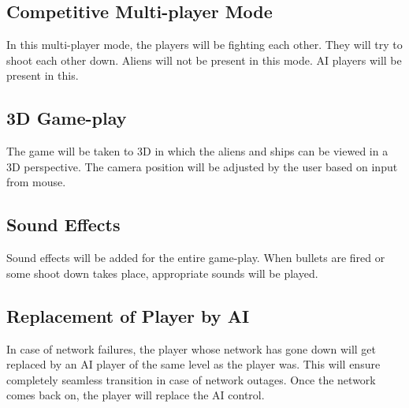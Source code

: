 \documentclass{article}
\begin{document}
		\subsection{Competitive Multi-player Mode}
			In this multi-player mode, the players will be fighting each other. They will try to shoot each other down. Aliens will not be present in this mode. AI players will be present in this.
		\subsection{3D Game-play}
			The game will be taken to 3D in which the aliens and ships can be viewed in a 3D perspective. The camera position will be adjusted by the user based on input from mouse.
		\subsection{Sound Effects}
			Sound effects will be added for the entire game-play. When bullets are fired or some shoot down takes place, appropriate sounds will be played.
		\subsection{Replacement of Player by AI}
			In case of network failures, the player whose network has gone down will get replaced by an AI player of the same level as the player was. This will ensure completely seamless transition in case of network outages. Once the network comes back on, the player will replace the AI control. 
\end{document}
